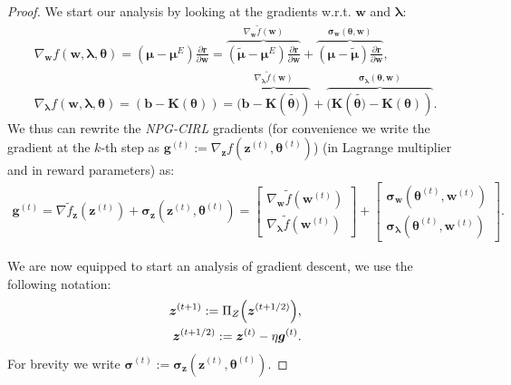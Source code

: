 \begin{proof}
We start our analysis by looking at the gradients w.r.t. $\bm{w}$ and $\bm{\lambda}$:
\begin{align*}
    \nabla_{\bm{w}} f(\bm{w},\bm{\lambda},{\bm{\theta}}) =
    (\bm{\mu}-\bm{\mu}^E) \frac{\partial \bm{r}}{\partial \bm{w}}
    =  \overbrace{
        (\tilde{\bm{\mu}}-\bm{\mu}^E) \frac{\partial \bm{r}}{\partial \bm{w}}
    }^{ 
        \nabla_{\bm{w}} \tilde{f}(\bm{w})
    }
    +\overbrace{(\bm{\mu}-\tilde{\bm{\mu}}) \frac{\partial \bm{r}}{\partial \bm{w}} }^{
        \bm{\sigma}_{\bm{w}}(\bm{\theta},\bm{w})
    } ,
    \\
    \nabla_{\bm{\lambda}} f(\bm{w},\bm{\lambda},{\bm{\theta}}) =  (\bm{b}-\bm{K}(\bm{\theta})) =  \overbrace{(\bm{b}-\bm{K}(\tilde{\bm{\theta})}) }^{
        \nabla_{\bm{\lambda}} \tilde{f}(\bm{w})
    }+ \overbrace{(\bm{K}(\tilde{\bm{\theta})}-\bm{K}(\bm{\theta}))}^{
        \bm{\sigma}_{\bm{\lambda}}(\bm{\theta},\bm{w})
    }.
\end{align*}
We thus can rewrite the \textit{NPG-CIRL} gradients (for convenience we write the gradient at the $k$-th step as $\bm{g}^{(t)}:=\nabla_{\bm{z}} f(\bm{z}^{(t)},\bm{\theta}^{(t)})$) (in Lagrange multiplier and in reward parameters) as:
\begin{align*}
    \bm{g}^{(t)} = \nabla \tilde{f}_{\bm{z}} (\bm{z}^{(t)}) + \bm{\sigma}_{\bm{z}}(\bm{z}^{(t)},\bm{\theta}^{(t)})
    = \begin{bmatrix}
        \nabla_{\bm{w}} \tilde{f}(\bm{w}^{(t)}) \\
        \nabla_{\bm{\lambda}} \tilde{f}(\bm{w}^{(t)})
    \end{bmatrix}
    + \begin{bmatrix}
        \bm{\sigma}_{\bm{w}}(\bm{\theta}^{(t)},\bm{w}^{(t)}) \\
        \bm{\sigma}_{\bm{\lambda}}(\bm{\theta}^{(t)},\bm{w}^{(t)})
    \end{bmatrix}.
\end{align*}

We are now equipped to start an analysis of gradient descent, we use the following notation:
\begin{align*}
    \bm{z}^{(t+1)} := \Pi_Z \Bigl( \bm{z}^{(t+1/2)}  \Bigr),\\
    \bm{z}^{(t+1/2)} := \bm{z}^{(t)} - \eta \bm{g}^{(t)}.
\end{align*}
For brevity we write $\bm{\sigma}^{(t)} := \bm{\sigma}_{\bm{z}}(\bm{z}^{(t)},\bm{\theta}^{(t)})$. 


\end{proof}
